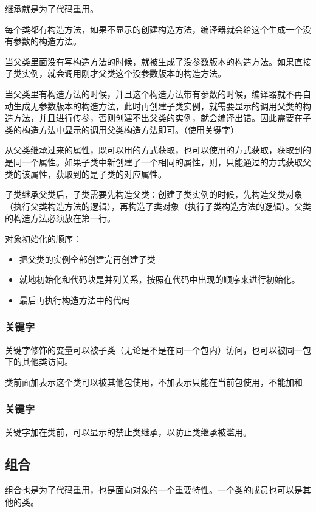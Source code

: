\documentclass[a4paper]{report}
\begin{document}
继承就是为了代码重用。

每个类都有构造方法，如果不显示的创建构造方法，编译器就会给这个生成一个没有参数的构造方法。

当父类里面没有写构造方法的时候，就被生成了没参数版本的构造方法。如果直接子类实例，就会调用刚才父类这个没参数版本的构造方法。

当父类里有构造方法的时候，并且这个构造方法带有参数的时候，编译器就不再自动生成无参数版本的构造方法，此时再创建子类实例，就需要显示的调用父类的构造方法，并且进行传参，否则创建不出父类的实例，就会编译出错。因此需要在子类的构造方法中显示的调用父类构造方法即可。（使用关键字）

从父类继承过来的属性，既可以用的方式获取，也可以使用的方式获取，获取到的是同一个属性。如果子类中新创建了一个相同的属性，则，只能通过的方式获取父类的该属性，获取到的是子类的对应属性。

子类继承父类后，子类需要先构造父类：创建子类实例的时候，先构造父类对象（执行父类构造方法的逻辑），再构造子类对象（执行子类构造方法的逻辑）。父类的构造方法必须放在第一行。

对象初始化的顺序：
\begin{itemize}
\itemsep=0pt \parskip =0pt
  \item 把父类的实例全部创建完再创建子类
  \item 就地初始化和代码块是并列关系，按照在代码中出现的顺序来进行初始化。
  \item 最后再执行构造方法中的代码
\end{itemize}

\subsubsection{关键字}
关键字修饰的变量可以被子类（无论是不是在同一个包内）访问，也可以被同一包下的其他类访问。

类前面加表示这个类可以被其他包使用，不加表示只能在当前包使用，不能加和

\subsubsection{关键字}
关键字加在类前，可以显示的禁止类继承，以防止类继承被滥用。
\subsection{组合}
组合也是为了代码重用，也是面向对象的一个重要特性。一个类的成员也可以是其他的类。
\end{document}
